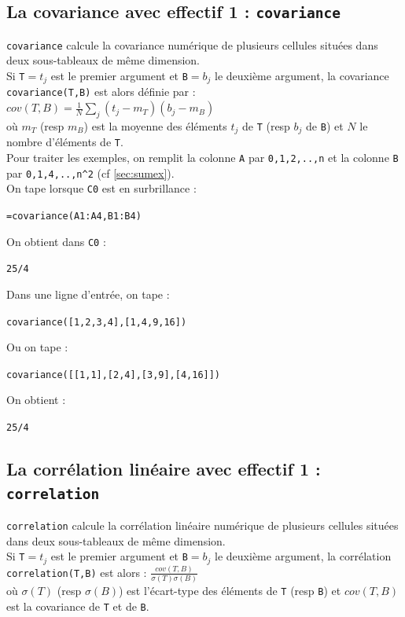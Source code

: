 \documentclass[a4paper,11pt]{book}
\begin{document}
\subsection{La covariance avec  effectif 1 : {\tt covariance}}\label{sec:cov}
{\tt covariance} calcule la covariance  num\'erique de plusieurs cellules
 situ\'ees dans deux sous-tableaux de m\^eme dimension.\\
Si {\tt T}$=t_{j}$ est le premier argument et {\tt B}$=b_{j}$ le 
deuxi\`eme argument, la covariance  {\tt covariance(T,B)} est alors d\'efinie 
par :\\
$\displaystyle cov(T,B)=\frac{1}{N}\sum_{j}(t_{j}-m_T)(b_{j}-m_B)$\\
o\`u $ m_T$ (resp $ m_B$) est la moyenne des \'el\'ements  $t_{j}$ de {\tt T} 
(resp  $b_{j}$ de {\tt B}) et  $N$ le nombre d'\'el\'ements de {\tt T}.\\ 
Pour traiter les exemples,  on remplit la colonne {\tt A} par 
{\tt 0,1,2,..,n} et la colonne 
{\tt B} par {\tt 0,1,4,..,n\verb|^|2} (cf \ref{sec:sumex}).\\
On tape lorsque {\tt C0} est en surbrillance :
\begin{center}{\tt =covariance(A1:A4,B1:B4)}\end{center}
On obtient dans {\tt C0} :
\begin{center}{\tt 25/4 }\end{center}
Dans une ligne d'entr\'ee, on tape :
\begin{center}{\tt covariance([1,2,3,4],[1,4,9,16])}\end{center}
Ou on tape :
\begin{center}{\tt covariance([[1,1],[2,4],[3,9],[4,16]])}\end{center}
On obtient  :
\begin{center}{\tt 25/4 }\end{center}
\subsection{La corr\'elation  lin\'eaire avec effectif 1 : {\tt correlation}}\label{sec:corr}
{\tt correlation} calcule la corr\'elation lin\'eaire num\'erique de plusieurs 
cellules situ\'ees dans deux sous-tableaux de m\^eme dimension.\\
Si {\tt T}$=t_{j}$ est le premier argument et {\tt B}$=b_{j}$ le 
deuxi\`eme argument, la corr\'elation  {\tt correlation(T,B)} est alors :
$\displaystyle  \frac{cov(T,B)}{\sigma(T) \sigma(B)}$\\
o\`u $ \sigma(T)$ (resp $ \sigma(B)$) est l'\'ecart-type des 
\'el\'ements de {\tt T} (resp {\tt B}) et  $cov(T,B)$ est la covariance de 
{\tt T} et de {\tt B}.
 
\end{document}
